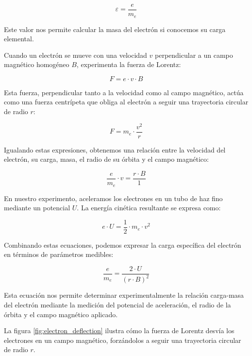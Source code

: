 \documentclass[twocolumn,a4paper,11pt]{scrartcl}
\begin{document}
\begin{equation}
\varepsilon = \frac{e}{m_e}
\end{equation}

Este valor nos permite calcular la masa del electrón si conocemos su carga elemental.

Cuando un electrón se mueve con una velocidad $v$ perpendicular a un campo magnético homogéneo $B$, experimenta la fuerza de Lorentz:

\begin{equation}
F = e \cdot v \cdot B
\end{equation}

Esta fuerza, perpendicular tanto a la velocidad como al campo magnético, actúa como una fuerza centrípeta que obliga al electrón a seguir una trayectoria circular de radio $r$:

\begin{equation}
F = m_e \cdot \frac{v^2}{r}
\end{equation}

Igualando estas expresiones, obtenemos una relación entre la velocidad del electrón, su carga, masa, el radio de su órbita y el campo magnético:

\begin{equation}
\frac{e}{m_e} \cdot v = \frac{r \cdot B}{1}
\end{equation}

En nuestro experimento, aceleramos los electrones en un tubo de haz fino mediante un potencial $U$. La energía cinética resultante se expresa como:

\begin{equation}
e \cdot U = \frac{1}{2} \cdot m_e \cdot v^2
\end{equation}

Combinando estas ecuaciones, podemos expresar la carga específica del electrón en términos de parámetros medibles:

\begin{equation}
\frac{e}{m_e} = \frac{2 \cdot U}{(r \cdot B)^2}
\end{equation}

Esta ecuación nos permite determinar experimentalmente la relación carga-masa del electrón mediante la medición del potencial de aceleración, el radio de la órbita y el campo magnético aplicado.

La figura \ref{fig:electron_deflection} ilustra cómo la fuerza de Lorentz desvía los electrones en un campo magnético, forzándolos a seguir una trayectoria circular de radio $r$.
\end{document}
